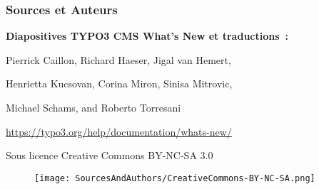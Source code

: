 %

\begin{frame}[fragile]
	\frametitle{Sources et Auteurs}

	\vspace{-0.6cm}

	\centerline{\textbf{Diapositives TYPO3 CMS What's New et traductions~:}}

	\begin{center}
		\centerline{Pierrick Caillon, Richard Haeser, Jigal van Hemert,}
		\centerline{Henrietta Kucsovan, Corina Miron, Sinisa Mitrovic,}
		\centerline{Michael Schams, and Roberto Torresani}
	\end{center}

	\vspace{0.6cm}

	\smaller\begin{center}\url{https://typo3.org/help/documentation/whats-new/}\end{center}\normalsize

	\vspace{1cm}

	\smaller\begin{center}Sous licence Creative Commons BY-NC-SA 3.0\end{center}\normalsize
	\begin{figure}\vspace*{-0.4cm}
		\texttt{[image: SourcesAndAuthors/CreativeCommons-BY-NC-SA.png]}
	\end{figure}

\end{frame}

